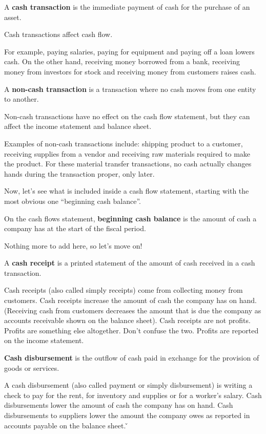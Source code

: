 A \textbf{cash transaction} is the immediate payment of cash for the purchase of an asset.
\ed

Cash transactions affect cash flow.

\be
For example, paying salaries, paying for equipment and paying off a loan lowers cash. On the other hand, receiving
money borrowed from a bank, receiving money from investors for stock and receiving money from customers raises cash.
\ee

A \textbf{non-cash transaction} is a transaction where no cash moves from one entity to another.
\ed

Non-cash transactions have no effect on the cash flow statement, but they can affect the income statement and balance
sheet.

\be
Examples of non-cash transactions include: shipping product to a customer, receiving supplies from a vendor and
receiving raw materials required to make the product. For these material transfer transactions, no cash actually
changes hands during the transaction proper, only later.
\ee

Now, let's see what is included inside a cash flow statement, starting with the most obvious one ``beginning cash
balance''.

On the cash flows statement, \textbf{beginning cash balance} is the amount of cash a company has at the start of the
fiscal period.
\ed

Nothing more to add here, so let's move on!

A \textbf{cash receipt} is a printed statement of the amount of cash received in a cash transaction.
\ed

Cash receipts (also called simply receipts) come from collecting money from customers. Cash receipts increase the
amount of cash the company has on hand. (Receiving cash from customers decreases the amount that is due the
company as accounts receivable shown on the balance sheet). Cash receipts are not profits. Profits are something
else altogether. Don't confuse the two. Profits are reported on the income statement.

\textbf{Cash disbursement} is the outflow of cash paid in exchange for the provision of goods or services.
\ed

A cash disbursement (also called payment or simply disbursement) is writing a check to pay for the rent, for
inventory and supplies or for a worker's salary. Cash disbursements lower the amount of cash the company has on hand.
Cash disbursements to suppliers lower the amount the company owes as reported in accounts payable on the
balance sheet. \v 

